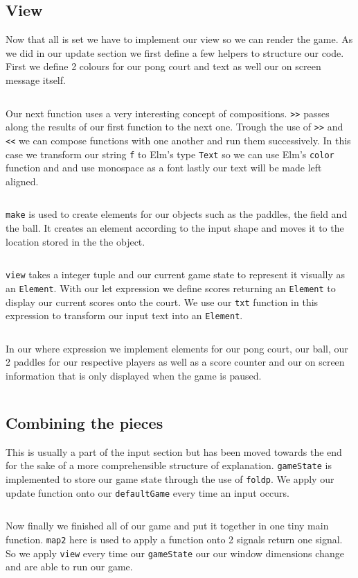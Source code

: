 \documentclass[pdftex,a4paper]{extarticle}
\begin{document}
\subsection{View}
Now that all is set we have to implement our view so we can render the game.
As we did in our update section we first define a few helpers to structure our code.
First we define 2 colours for our pong court and text as well our on screen message itself.
\inputminted [breaklines=true] {haskell}{pong(13a).hs}
Our next function uses a very interesting concept of compositions.
{\tt\textgreater\textgreater} passes along the results of our first function to the next one.
Trough the use of {\tt\textgreater\textgreater} and {\tt\textless\textless} we can compose functions with one another and run them successively.
In this case we transform our string {\tt f} to Elm's type {\tt Text} so we can use Elm's {\tt color} function and and use monospace as a font lastly our text will be made left aligned.
\inputminted [breaklines=true] {haskell}{pong(13b).hs}
{\tt make} is used to create elements for our objects such as the paddles, the field and the ball.
It creates an element according to the input shape and moves it to the location stored in the the object.
\inputminted [breaklines=true] {haskell}{pong(13c).hs}
{\tt view} takes a integer tuple and our current game state to represent it visually as an {\tt Element}.
With our let expression we define scores returning an {\tt Element} to display our current scores onto the court.
We use our {\tt txt} function in this expression to transform our input text into an {\tt Element}.
\inputminted [breaklines=true] {haskell}{pong(14a).hs}
In our where expression we implement elements for our pong court, our ball, our 2 paddles for our respective players as well as a score counter and our on screen information that is only displayed when the game is paused.
\inputminted [breaklines=true] {haskell}{pong(14b).hs}
\subsection{Combining the pieces}
This is usually a part of the input section but has been moved towards the end for the sake of a more comprehensible structure of explanation.
{\tt gameState} is implemented to store our game state through the use of {\tt foldp}.
We apply our update function onto our {\tt defaultGame} every time an input occurs.
\inputminted [breaklines=true] {haskell}{pong(15).hs}
Now finally we finished all of our game and put it together in one tiny main function.
{\tt map2} here is used to apply a function onto 2 signals return one signal.
So we apply {\tt view} every time our {\tt gameState} our our window dimensions change and are able to run our game.
\inputminted [breaklines=true] {haskell}{pong(16).hs}
\end{document}
